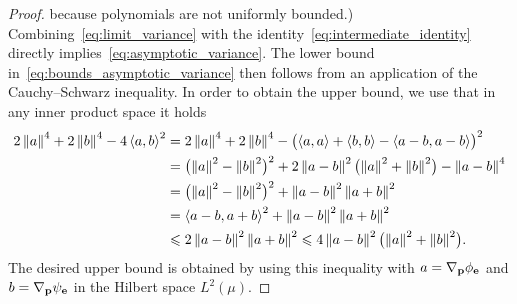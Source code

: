 \documentclass[11pt,a4paper]{article}
\begin{document}
\begin{proof}
    because polynomials are not uniformly bounded.)
    Combining~\eqref{eq:limit_variance} with the identity~\eqref{eq:intermediate_identity} directly implies~\eqref{eq:asymptotic_variance}.
    The lower bound in~\eqref{eq:bounds_asymptotic_variance} then follows from an application of the Cauchy--Schwarz inequality.
    In order to obtain the upper bound,
    we use that in any inner product space it holds
    \begin{align*}
        2 \norm{a}^4 + 2 \norm{b}^4 - 4\ip{a}{b}^2
        &= 2 \norm{a}^4 + 2 \norm{b}^4 - \bigl(\ip{a}{a} + \ip{b}{b} - \ip{a-b}{a-b} \bigr)^2 \\
        &= \bigl(\norm{a}^2 - \norm{b}^2 \bigr)^2 + 2 \norm{a-b}^2 \bigl(\norm{a}^2 + \norm{b}^2 \bigr) - \norm{a-b}^4 \\
        &= \bigl(\norm{a}^2 - \norm{b}^2 \bigr)^2 + \norm{a-b}^2 \norm{a + b}^2 \\
        &= \ip{a - b}{a + b}^2 + \norm{a-b}^2 \norm{a + b}^2 \\
        &\leq 2 \norm{a - b}^2 \norm{a + b}^2
        \leq 4 \norm{a - b}^2 \bigl(\norm{a}^2 + \norm{b}^2\bigr).
    \end{align*}
    The desired upper bound is obtained by
    using this inequality with $a = \nabla_{\boldsymbol{\mathbf p}} \phi_{\boldsymbol{\mathbf e}}$ and $b = \nabla_{\boldsymbol{\mathbf p}} \psi_{\boldsymbol{\mathbf e}}$ in the Hilbert space $L^2(\mu)$.
\end{proof}
\end{document}
